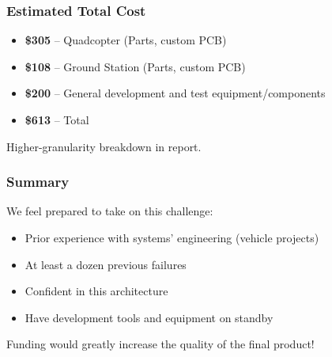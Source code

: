 \documentclass{beamer}
\begin{document}
\begin{frame}
\frametitle{Estimated Total Cost}
\large
\vspace{0.2in}
\begin{itemize}
\item \textbf{\$305} -- Quadcopter (Parts, custom PCB)
\item \textbf{\$108} -- Ground Station (Parts, custom PCB)
\item \textbf{\$200} -- General development and test equipment/components
\item \textbf{\$613} -- Total
\end{itemize}
\vspace{0.2in}
\Large
Higher-granularity breakdown in report.
    
\end{frame}

\begin{frame}
\frametitle{Summary}
\large
We feel prepared to take on this challenge:
\begin{itemize}
    \item[\textbullet] Prior experience with systems' engineering (vehicle projects)
    \item[\textbullet] At least a dozen previous failures
    \item[\textbullet] Confident in this architecture
    \item[\textbullet] Have development tools and equipment on standby
\end{itemize}
\vspace{0.5in}
\begin{center}
Funding would greatly increase the quality of the final product!
\end{center}
\end{frame}
\end{document}
